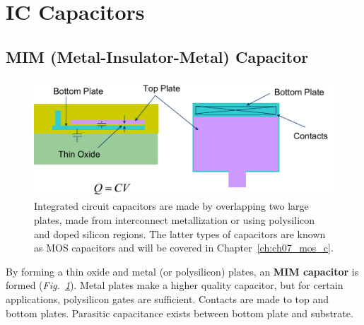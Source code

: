 \section{IC Capacitors}
\subsection{MIM (Metal-Insulator-Metal) Capacitor}
\begin{figure}[tb]
\centering
\includegraphics[width=.95\columnwidth]{mod2-2_ICtech_sld_17}
\caption{Integrated circuit capacitors are made by overlapping two large plates, made from interconnect metallization or using polysilicon and doped silicon regions.  The latter types of capacitors are known as MOS capacitors and will be covered in Chapter~\ref{ch:ch07_mos_c}.}
\label{fig:mod2-2_ICtech_sld_17}
\end{figure}
By forming a thin oxide and metal (or polysilicon) plates, an \textbf{MIM capacitor} is formed (\emph{Fig.~\ref{fig:mod2-2_ICtech_sld_17}}).  Metal plates make a higher quality capacitor, but for certain applications, polysilicon gates are sufficient.  Contacts are made to top and bottom plates.  Parasitic capacitance exists between bottom plate and substrate.
